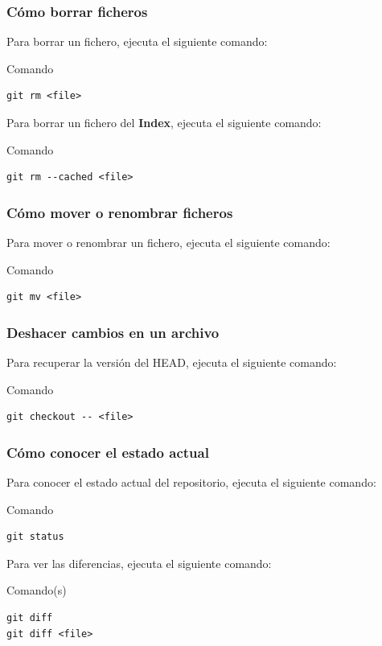 \documentclass{beamer}
\begin{document}
\begin{frame}[fragile]
\frametitle{Cómo borrar ficheros}
Para borrar un fichero, ejecuta el siguiente comando:
\begin{block}{Comando}
\begin{verbatim}
git rm <file>
\end{verbatim}
\end{block}
\vskip 1.00cm
Para borrar un fichero del \textbf{Index}, ejecuta el siguiente comando:
\begin{block}{Comando}
\begin{verbatim}
git rm --cached <file>
\end{verbatim}
\end{block}
\end{frame}

\begin{frame}[fragile]
\frametitle{Cómo mover o renombrar ficheros}
Para mover o renombrar un fichero, ejecuta el siguiente comando:
\begin{block}{Comando}
\begin{verbatim}
git mv <file>
\end{verbatim}
\end{block}
\end{frame}

\begin{frame}[fragile]
\frametitle{Deshacer cambios en un archivo}
Para recuperar la versión del HEAD, ejecuta el siguiente comando:
\begin{block}{Comando}
\begin{verbatim}
git checkout -- <file>
\end{verbatim}
\end{block}
\end{frame}

\begin{frame}[fragile]
\frametitle{Cómo conocer el estado actual}
Para conocer el estado actual del repositorio, ejecuta el siguiente comando:
\begin{block}{Comando}
\begin{verbatim}
git status
\end{verbatim}
\end{block}
\vskip 1.00cm
Para ver las diferencias, ejecuta el siguiente comando:
\begin{block}{Comando(s)}
\begin{verbatim}
git diff
git diff <file>
\end{verbatim}
\end{block}
\end{frame}
\end{document}
